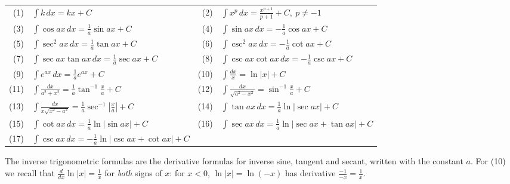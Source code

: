 \documentclass[11pt]{article}
\begin{document}
\begin{center}
\begin{tabular}{rlrl}
(1) & $\int k\,dx=kx+C$ & (2) & $\int x^p\,dx=\frac{x^{p+1}}{p+1}+C,\ p\ne-1$ \\
(3) & $\int\cos ax\,dx=\frac1a\sin ax+C$ & (4) & $\int\sin ax\,dx=-\frac1a\cos ax+C$ \\
(5) & $\int\sec^2ax\,dx=\frac1a\tan ax+C$ & (6) & $\int\csc^2ax\,dx=-\frac1a\cot ax+C$ \\
(7) & $\int\sec ax\tan ax\,dx=\frac1a\sec ax+C$ & (8) & $\int\csc ax\cot ax\,dx=-\frac1a\csc ax+C$ \\
(9) & $\int e^{ax}\,dx=\frac1ae^{ax}+C$ & (10) & $\int\frac{dx}{x}=\ln\lvert x\rvert+C$ \\
(11) & $\int\frac{dx}{a^2+x^2}=\frac1a\tan^{-1}\frac xa+C$ & (12) & $\int\frac{dx}{\sqrt{a^2-x^2}}=\sin^{-1}\frac xa+C$ \\
(13) & $\int\frac{dx}{x\sqrt{x^2-a^2}}=\frac1a\sec^{-1}\left\lvert\frac xa\right\rvert+C$ & (14) & $\int\tan ax\,dx=\frac1a\ln\lvert\sec ax\rvert+C$ \\
(15) & $\int\cot ax\,dx=\frac1a\ln\lvert\sin ax\rvert+C$ & (16) & $\int\sec ax\,dx=\frac1a\ln\lvert\sec ax+\tan ax\rvert+C$ \\
(17) & $\int\csc ax\,dx=-\frac1a\ln\lvert\csc ax+\cot ax\rvert+C$ & & \\
\end{tabular}
\end{center}

The inverse trigonometric formulas are the derivative formulas for inverse sine, tangent and secant, written with the constant $a$. For (10) we recall that $\frac{d}{dx}\ln\lvert x\rvert=\frac1x$ for \emph{both} signs of $x$: for $x<0$, $\ln\lvert x\rvert=\ln(-x)$ has derivative $\frac{-1}{-x}=\frac1x$.
\end{document}
